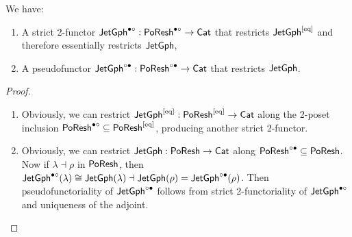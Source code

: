 \documentclass[a4paper]{memoir}
\begin{document}
\begin{corollary} \label{thm:poresh-jetgph-with-adjoint}
	We have:
	\begin{enumerate}
		\item A strict 2-functor $\mathsf{JetGph}^{\bullet \circ} : \mathsf{PoResh}^{\bullet \circ} \to {\mathsf{Cat}}$ that restricts $\mathsf{JetGph}^{[{\mathrm{eq}}]}$ and therefore essentially restricts $\mathsf{JetGph}$,
		\item A pseudofunctor $\mathsf{JetGph}^{\circ \bullet} : \mathsf{PoResh}^{\circ \bullet} \to {\mathsf{Cat}}$ that restricts $\mathsf{JetGph}$.
	\end{enumerate}
\end{corollary}
\begin{proof}
	\begin{enumerate}
		\item Obviously, we can restrict $\mathsf{JetGph}^{[{\mathrm{eq}}]} : \mathsf{PoResh}^{[{\mathrm{eq}}]} \to {\mathsf{Cat}}$ along the 2-poset inclusion $\mathsf{PoResh}^{\bullet \circ} \subseteq \mathsf{PoResh}^{[{\mathrm{eq}}]}$, producing another strict 2-functor.
		\item Obviously, we can restrict $\mathsf{JetGph} : \mathsf{PoResh} \to {\mathsf{Cat}}$ along $\mathsf{PoResh}^{\circ \bullet} \subseteq \mathsf{PoResh}$.
		Now if $\lambda \dashv \rho$ in $\mathsf{PoResh}$, then $\mathsf{JetGph}^{\bullet \circ}(\lambda) \cong \mathsf{JetGph}(\lambda) \dashv \mathsf{JetGph}(\rho) = \mathsf{JetGph}^{\circ \bullet}(\rho)$.
		Then pseudofunctoriality of $\mathsf{JetGph}^{\circ \bullet}$ follows from strict 2-functoriality of $\mathsf{JetGph}^{\bullet \circ}$ and uniqueness of the adjoint. \qedhere
	\end{enumerate}
\end{proof}
\end{document}
